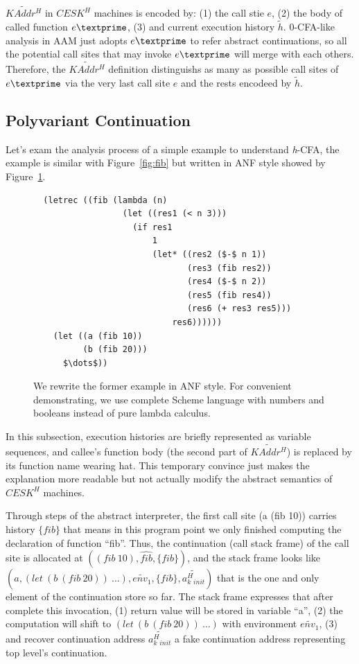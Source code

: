 \documentclass{article}
\begin{document}
$\widetilde{KAddr^H}$ in $CESK^H$ machines is encoded by: (1) the call stie $e$, (2) the body of called function $e\textprime$, (3) and current execution history $\tilde{h}$. 0-CFA-like analysis in AAM just adopts $e\textprime$ to refer abstract continuations, so all the potential call sites that may invoke $e\textprime$ will merge with each others. Therefore, the $\widetilde{KAddr^H}$ definition distinguishs as many as possible call sites of $e\textprime$ via the very last call site $e$ and the rests encodeed by $\tilde{h}$.

\subsection{Polyvariant Continuation}
\label{sub:Polyvariant Continuation}
Let's exam the analysis process of a simple example to understand \textit{h}-CFA, the example is similar with Figure~\ref{fig:fib} but written in ANF style showed by Figure~\ref{fig:anf-fib}.

\begin{figure}[h]
\small
\lstset{language=Lisp}
\begin{lstlisting}
  (letrec ((fib (lambda (n)
                  (let ((res1 (< n 3)))
                    (if res1
                        1
                        (let* ((res2 ($-$ n 1))
                               (res3 (fib res2))
                               (res4 ($-$ n 2))
                               (res5 (fib res4))
                               (res6 (+ res3 res5)))
                            res6))))))
    (let ((a (fib 10))
          (b (fib 20)))
      $\dots$))
\end{lstlisting}
\caption{
We rewrite the former example in ANF style.
For convenient  demonstrating, we use complete Scheme language with numbers and booleans instead of pure lambda calculus.
}
\label{fig:anf-fib}
\end{figure}

In this subsection, execution histories are briefly represented as variable sequences, and callee's function body (the second part of $\widetilde{KAddr^H}$) is replaced by its function name wearing hat. This temporary convince just makes the explanation more readable but not actually modify the abstract semantics of $CESK^H$ machines.

Through steps of the abstract interpreter, the first call site (a (fib 10)) carries history $\{fib\}$ that means in this program point we only finished computing the declaration of function ``fib''.
Thus, the continuation (call stack frame) of the call site is allocated at $((fib\ 10), \widehat{fib}, \{fib\})$, and the stack frame looks like $(a, (let\ (b\ (fib\ 20))\ \dots), \widetilde{env_1}, \{fib\}, \widetilde{a^H_k{}_{init}})$ that is the one and only element of the continuation store so far.
The stack frame expresses that after complete this invocation,
(1) return value will be stored in variable ``a'',
(2) the computation will shift to $(let\ (b\ (fib\ 20))\ \dots)$ with environment $\widetilde{env_1}$,
(3) and recover continuation address $\widetilde{a^H_k{}_{init}}$ a fake continuation address representing top level's continuation.
\end{document}
